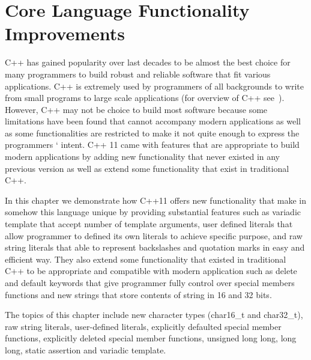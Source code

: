 \documentclass[11pt]{report}
\begin{document}
\chapter{Core Language Functionality Improvements}
\label{chapter: Functionality Improvements}
C++ has gained popularity over last decades to be almost the best choice for many programmers to build robust and reliable software that fit various applications. C++ is extremely used by programmers of all backgrounds to write from small programs to large scale applications (for overview of C++ see~\cite{Stroustrup:2012:Cpp11}). However, C++ may not be choice to build most software because some limitations have been found  that cannot accompany modern applications as well as some functionalities are restricted to make it not quite enough to express the programmers ‘ intent. C++ 11 came with features that are appropriate to build modern applications by adding new functionality that never existed in any previous version  as well as extend some functionality that exist in traditional C++.

In this chapter we demonstrate how C++11 offers new functionality that make in somehow this language unique by providing substantial features such as variadic template that accept number of template arguments, user defined literals that allow programmer to defined its own literals to achieve specific purpose, and raw string literals that able to represent backslashes and quotation marks in easy and efficient way.  They also extend some functionality that existed in traditional C++ to be appropriate and compatible with modern application such as delete and default keywords that give programmer fully control over special members functions and new strings that store contents of string in 16 and 32 bits.

The topics of this chapter include new character types (char16\_t and char32\_t), raw string literals, user-defined literals, explicitly defaulted special member functions, explicitly deleted special member functions, unsigned long long, long long, static assertion and variadic template.
\end{document}
